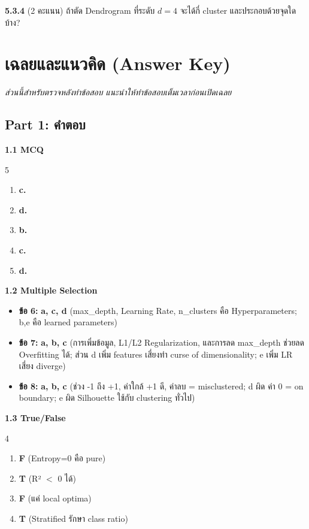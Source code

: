 \documentclass[a4paper,12pt]{article}
\newcommand{\ans}[1]{\textbf{#1}}
\begin{document}
\newpage
\textbf{5.3.4} (2 คะแนน) ถ้าตัด Dendrogram ที่ระดับ $d = 4$ จะได้กี่ cluster และประกอบด้วยจุดใดบ้าง?
\vspace{3cm}

\newpage

\section*{เฉลยและแนวคิด (Answer Key)}
\textit{ส่วนนี้สำหรับตรวจหลังทำข้อสอบ แนะนำให้ทำข้อสอบเต็มเวลาก่อนเปิดเฉลย}

\subsection*{Part 1: คำตอบ}

\noindent\textbf{1.1 MCQ}
\begin{multicols}{5}
\begin{enumerate}[label=\textbf{\arabic*.}]
    \item \ans{c.}
    \item \ans{d.}
    \item \ans{b.}
    \item \ans{c.}
    \item \ans{d.}
\end{enumerate}
\end{multicols}

\noindent\textbf{1.2 Multiple Selection}
\begin{itemize}
    \item \textbf{ข้อ 6:} \ans{a, c, d} (max\_depth, Learning Rate, n\_clusters คือ Hyperparameters; b,e คือ learned parameters)
      \item \textbf{ข้อ 7:} \ans{a, b, c} (การเพิ่มข้อมูล, L1/L2 Regularization, และการลด max\_depth ช่วยลด Overfitting ได้; ส่วน d เพิ่ม features เสี่ยงทำ curse of dimensionality; e เพิ่ม LR เสี่ยง diverge)
    \item \textbf{ข้อ 8:} \ans{a, b, c} (ช่วง -1 ถึง +1, ค่าใกล้ +1 ดี, ค่าลบ = misclustered; d ผิด ค่า 0 = on boundary; e ผิด Silhouette ใช้กับ clustering ทั่วไป)
\end{itemize}

\noindent\textbf{1.3 True/False}
\begin{multicols}{4}
\begin{enumerate}[label=\textbf{\arabic*.},start=9]
    \item \ans{F} (Entropy=0 คือ pure)
    \item \ans{T} (R² $<$ 0 ได้)
    \item \ans{F} (แค่ local optima)
    \item \ans{T} (Stratified รักษา class ratio)
\end{enumerate}
\end{multicols}
\end{document}
